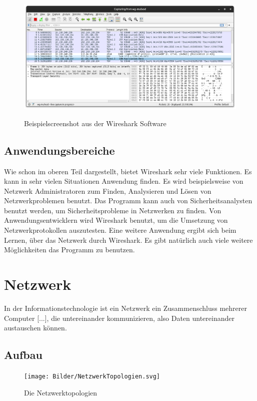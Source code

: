 \documentclass[12pt]{article}
\begin{document}
\begin{figure}[h]
	\begin{center}
		\includegraphics[scale=0.25]{Bilder/Screenshot_1.png}
		\label{fig:figure2}
		\caption{Beispielscreenshot aus der Wireshark Software \cite{screenshots-self}}
	\end{center}
\end{figure}



\subsection{Anwendungsbereiche}
Wie schon im oberen Teil dargestellt, bietet Wireshark sehr viele Funktionen. Es kann in sehr vielen Situationen Anwendung finden. Es wird beispielsweise von Netzwerk Administratoren zum Finden, Analysieren und Lösen von Netzwerkproblemen benutzt. Das Programm kann auch von Sicherheitsanalysten benutzt werden, um Sicherheitsprobleme in Netzwerken zu finden. Von Anwendungsentwicklern wird Wireshark benutzt, um die Umsetzung von Netzwerkprotokollen auszutesten. Eine weitere Anwendung ergibt sich beim Lernen, über das Netzwerk durch Wireshark. Es gibt natürlich auch viele weitere Möglichkeiten das Programm zu benutzen.\cite{intended-purposes}

\section{Netzwerk}
In der Informationstechnologie ist ein Netzwerk ein Zusammenschluss mehrerer Computer [...], die untereinander kommunizieren, also Daten untereinander austauschen können.\cite{netzwerk-kurthelec}
\subsection{Aufbau}

\begin{figure}
	\centering
	\texttt{[image: Bilder/NetzwerkTopologien.svg]}
	\caption{Die Netzwerktopologien \cite{topologien-darstellung}}
	\label{fig:figure5}
\end{figure}
\end{document}
